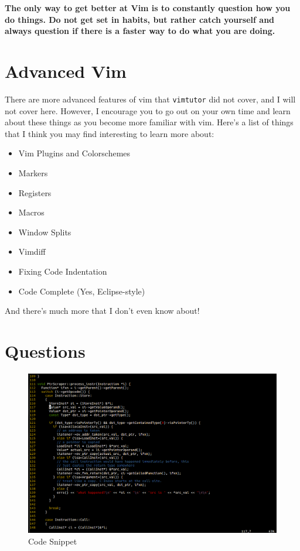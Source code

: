 {\bf The only way to get better at Vim is to constantly question how you do 
things. Do not get set in habits, but rather catch yourself 
and always question if there is a faster way to do what you are doing.}

\section{Advanced Vim}
There are more advanced features of vim that \texttt{vimtutor} did not cover,
and I will not cover here. However, I encourage you to go out on your own time
and learn about these things as you become more familiar with vim. Here's
a list of things that I think you may find interesting to learn more about:
\begin{itemize}
\item Vim Plugins and Colorschemes
\item Markers
\item Registers
\item Macros
\item Window Splits
\item Vimdiff
\item Fixing Code Indentation
\item Code Complete (Yes, Eclipse-style)
\end{itemize}

\noindent
And there's much more that I don't even know about!

\section{Questions}

\begin{figure}
\begin{center}
\leavevmode
\includegraphics[scale=0.3]{images/question-pic.png}
\end{center}
\caption{Code Snippet}
\label{fig:questionpic}
\end{figure}

